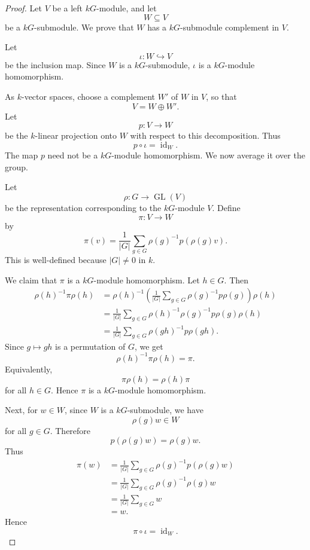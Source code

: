 \begin{proof}
    Let \(V\) be a left \(kG\)-module, and let
    \[
        W\subseteq V
    \]
    be a \(kG\)-submodule. We prove that \(W\) has a \(kG\)-submodule complement in
    \(V\).

    Let
    \[
        \iota:W\hookrightarrow V
    \]
    be the inclusion map. Since \(W\) is a \(kG\)-submodule, \(\iota\) is a
    \(kG\)-module homomorphism.

    As \(k\)-vector spaces, choose a complement \(W'\) of \(W\) in \(V\), so that
    \[
        V=W\oplus W'.
    \]
    Let
    \[
        p:V\longrightarrow W
    \]
    be the \(k\)-linear projection onto \(W\) with respect to this decomposition.
    Thus
    \[
        p\circ \iota=\operatorname{id}_W.
    \]
    The map \(p\) need not be a \(kG\)-module homomorphism. We now average it over
    the group.

    Let
    \[
        \rho:G\longrightarrow \operatorname{GL}(V)
    \]
    be the representation corresponding to the \(kG\)-module \(V\). Define
    \[
        \pi:V\longrightarrow W
    \]
    by
    \[
        \pi(v)
        =
        \frac{1}{|G|}
        \sum_{g\in G}
        \rho(g)^{-1}p(\rho(g)v).
    \]
    This is well-defined because \(|G|\neq 0\) in \(k\).

    We claim that \(\pi\) is a \(kG\)-module homomorphism. Let \(h\in G\). Then
    \[
        \begin{aligned}
            \rho(h)^{-1}\pi\rho(h)
             & =
            \rho(h)^{-1}
            \left(
            \frac{1}{|G|}
            \sum_{g\in G}
            \rho(g)^{-1}p\rho(g)
            \right)
            \rho(h)                                 \\
             & =
            \frac{1}{|G|}
            \sum_{g\in G}
            \rho(h)^{-1}\rho(g)^{-1}p\rho(g)\rho(h) \\
             & =
            \frac{1}{|G|}
            \sum_{g\in G}
            \rho(gh)^{-1}p\rho(gh).
        \end{aligned}
    \]
    Since \(g\mapsto gh\) is a permutation of \(G\), we get
    \[
        \rho(h)^{-1}\pi\rho(h)=\pi.
    \]
    Equivalently,
    \[
        \pi\rho(h)=\rho(h)\pi
    \]
    for all \(h\in G\). Hence \(\pi\) is a \(kG\)-module homomorphism.

    Next, for \(w\in W\), since \(W\) is a \(kG\)-submodule, we have
    \[
        \rho(g)w\in W
    \]
    for all \(g\in G\). Therefore
    \[
        p(\rho(g)w)=\rho(g)w.
    \]
    Thus
    \[
        \begin{aligned}
            \pi(w)
             & =
            \frac{1}{|G|}
            \sum_{g\in G}
            \rho(g)^{-1}p(\rho(g)w) \\
             & =
            \frac{1}{|G|}
            \sum_{g\in G}
            \rho(g)^{-1}\rho(g)w    \\
             & =
            \frac{1}{|G|}
            \sum_{g\in G}w          \\
             & =
            w.
        \end{aligned}
    \]
    Hence
    \[
        \pi\circ \iota=\operatorname{id}_W.
    \]


\end{proof}
